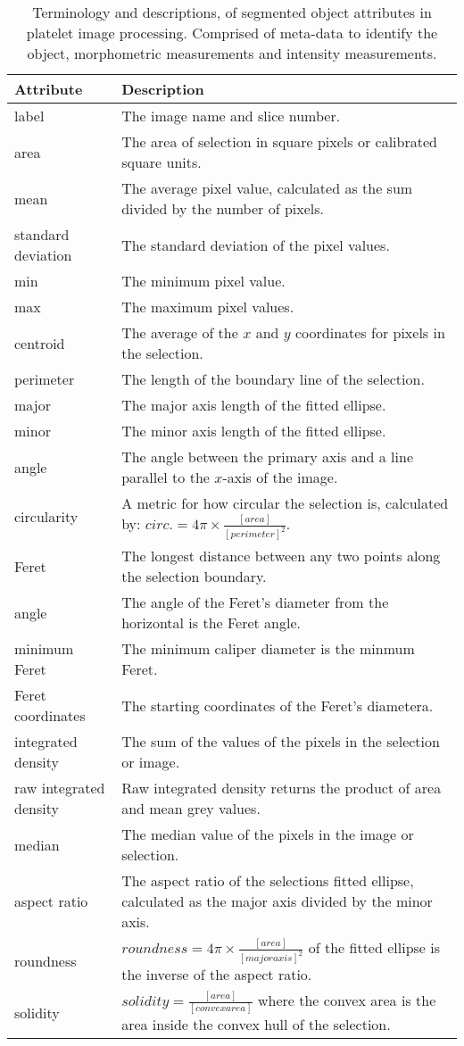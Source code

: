 \begin{table}[htbp]
\caption[Platelets segmented region attributes and properties]{Terminology and descriptions, of segmented object attributes in platelet image processing. Comprised of meta-data to identify the object, morphometric measurements and intensity measurements.}
\centering
\label{table:platelets:region_properties}
\begin{tabular}{p{4cm} p{10cm}}
	\toprule
	Attribute  & Description \\
	\midrule
	label & The image name and slice number.\\
	area & The area of selection in square pixels or calibrated square units.\\
	mean & The average pixel value, calculated as the sum divided by the number of pixels. \\
	standard deviation & The standard deviation of the pixel values. \\
	min & The minimum pixel value. \\
	max & The maximum pixel values. \\
	centroid & The average of the $x$ and $y$ coordinates for pixels in the selection. \\
	perimeter & The length of the boundary line of the selection. \\
	major & The major axis length of the fitted ellipse. \\
	minor & The minor axis length of the fitted ellipse. \\
	angle & The angle between the primary axis and a line parallel to the $x$-axis of the image. \\
	circularity & A metric for how circular the selection is, calculated by: $circ.=4\pi \times \frac{[area]}{[perimeter]^2}$. \\
	Feret & The longest distance between any two points along the selection boundary. \\
	angle & The angle of the Feret's diameter from the horizontal is the Feret angle. \\
	minimum Feret & The minimum caliper diameter is the minmum Feret. \\
	Feret coordinates & The starting coordinates of the Feret's diametera. \\
	integrated density & The sum of the values of the pixels in the selection or image. \\
	raw integrated density & Raw integrated density returns the product of area and mean grey values. \\
	median & The median value of the pixels in the image or selection. \\
	aspect ratio & The aspect ratio of the selections fitted ellipse, calculated as the major axis divided by the minor axis. \\
	roundness & $roundness=4\pi \times \frac{[area]}{[major axis]^2}$ of the fitted ellipse is the inverse of the aspect ratio. \\
	solidity & $solidity=\frac{[area]}{[convex area]}$ where the convex area is the area inside the convex hull of the selection. \\
	\bottomrule
\end{tabular}
\end{table}

